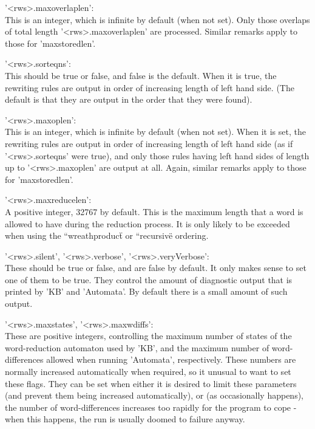 '<rws>.maxoverlaplen': \\
	This  is an  integer, which  is  infinite by default (when not
	set).      Only      those    overlaps     of   total   length
	'<rws>.maxoverlaplen'  are processed. Similar remarks apply to
	those for 'maxstoredlen'.

'<rws>.sorteqns': \\
	This should be true or false, and false  is the default.  When
	it is  true,   the rewriting  rules  are output  in order   of
	increasing length  of left  hand  side.  (The  default is that
	they are output in the order that they were found).

'<rws>.maxoplen': \\
	This is an  integer, which is  infinite  by default (when  not
	set).  When it is set, the rewriting rules are output in order
	of increasing length of left hand side (as if '<rws>.sorteqns'
	were true), and only  those  rules having  left hand sides  of
	length up to     '<rws>.maxoplen' are output   at all.  Again,
	similar remarks apply to those for 'maxstoredlen'.

'<rws>.maxreducelen': \\
	A positive integer,  32767  by default.  This is  the  maximum
	length that a word is   allowed to have during the   reduction
	process.  It is  only likely to  be   exceeded when using  the
	{``wreathproduct\"} or {``recursive\"} ordering.

'<rws>.silent', '<rws>.verbose', '<rws>.veryVerbose': \\
	These should be true  or false, and  are false by default.  It
	only makes sense to set one of them to  be true.  They control
	the  amount of diagnostic  output that is  printed by 'KB' and
	'Automata'. By default there is a small amount of such output.

'<rws>.maxstates', '<rws>.maxwdiffs': \\
	These are positive integers, controlling the maximum number of
	states of the word-reduction  automaton used by 'KB',  and the
	maximum  number   of  word-differences allowed   when  running
	'Automata', respectively. These numbers are normally increased
	automatically   when required, so it   unusual to  want to set
	these  flags. They can   be set when  either  it is desired to
	limit these parameters   (and  prevent them   being  increased
	automatically), or (as   occasionally happens), the number  of
	word-differences increases too rapidly for the program to cope
	-   when this happens, the  run  is usually  doomed to failure
	anyway.

